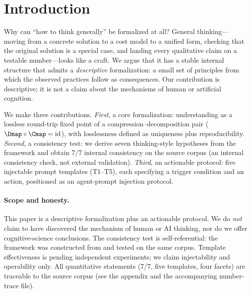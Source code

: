 \section{Introduction}
\label{sec:intro}

Why can ``how to think generally'' be formalized at all? General thinking---
moving from a concrete solution to a cost model to a unified form, checking that
the original solution is a special case, and landing every qualitative claim on
a testable number---looks like a craft. We argue that it has a stable internal
structure that admits a \emph{descriptive} formalization: a small set of
principles from which the observed practices follow as consequences. Our
contribution is descriptive; it is not a claim about the mechanisms of human or
artificial cognition.

We make three contributions. \emph{First}, a core formalization: understanding
as a lossless round-trip fixed point of a compression--decomposition pair
($\Dmap\circ\Cmap=\mathrm{id}$), with losslessness defined as uniqueness plus
reproducibility. \emph{Second}, a consistency test: we derive seven
thinking-style hypotheses from the framework and obtain 7/7 internal consistency
on the source corpus (an internal consistency check, not external validation).
\emph{Third}, an actionable protocol: five injectable prompt templates
(T1--T5), each specifying a trigger condition and an action, positioned as an
agent-prompt injection protocol.

\paragraph{Scope and honesty.}
This paper is a descriptive formalization plus an actionable protocol. We do
\emph{not} claim to have discovered the mechanism of human or AI thinking, nor
do we offer cognitive-science conclusions. The consistency test is
self-referential: the framework was constructed from and tested on the same
corpus. Template effectiveness is pending independent experiments; we claim
injectability and operability only. All quantitative statements (7/7, five
templates, four facets) are traceable to the source corpus (see the appendix and
the accompanying number-trace file).
